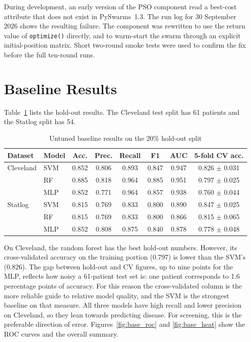 \documentclass[MTech]{ugthesis}
\begin{document}
During development, an early version of the PSO component read a best-cost attribute that does not exist in PySwarms~1.3. The run log for 30 September 2026 shows the resulting failure. The component was rewritten to use the return value of \texttt{optimize()} directly, and to warm-start the swarm through an explicit initial-position matrix. Short two-round smoke tests were used to confirm the fix before the full ten-round runs.

\section{Baseline Results}
Table~\ref{tab:baseline} lists the hold-out results. The Cleveland test split has 61 patients and the Statlog split has 54.

\begin{table}[htpb]
\small
\renewcommand{\arraystretch}{1.25}
\caption{Untuned baseline results on the 20\% hold-out split}
\label{tab:baseline}
\begin{tabular}{|p{1.9cm}|p{1.6cm}|c|c|c|c|c|c|}
\hline
\textbf{Dataset} & \textbf{Model} & \textbf{Acc.} & \textbf{Prec.} & \textbf{Recall} & \textbf{F1} & \textbf{AUC} & \textbf{5-fold CV acc.} \\ \hline
Cleveland & SVM & 0.852 & 0.806 & 0.893 & 0.847 & 0.947 & 0.826 $\pm$ 0.031 \\
          & RF  & 0.885 & 0.818 & 0.964 & 0.885 & 0.951 & 0.797 $\pm$ 0.025 \\
          & MLP & 0.852 & 0.771 & 0.964 & 0.857 & 0.938 & 0.760 $\pm$ 0.044 \\ \hline
Statlog   & SVM & 0.815 & 0.769 & 0.833 & 0.800 & 0.890 & 0.847 $\pm$ 0.025 \\
          & RF  & 0.815 & 0.769 & 0.833 & 0.800 & 0.866 & 0.815 $\pm$ 0.065 \\
          & MLP & 0.852 & 0.808 & 0.875 & 0.840 & 0.878 & 0.778 $\pm$ 0.048 \\ \hline
\end{tabular}
\end{table}

On Cleveland, the random forest has the best hold-out numbers. However, its cross-validated accuracy on the training portion (0.797) is lower than the SVM's (0.826). The gap between hold-out and CV figures, up to nine points for the MLP, reflects how noisy a 61-patient test set is: one patient corresponds to 1.6 percentage points of accuracy. For this reason the cross-validated column is the more reliable guide to relative model quality, and the SVM is the strongest baseline on that measure. All three models have high recall and lower precision on Cleveland, so they lean towards predicting disease. For screening, this is the preferable direction of error. Figures~\ref{fig:base_roc} and \ref{fig:base_heat} show the ROC curves and the overall summary.
\end{document}
